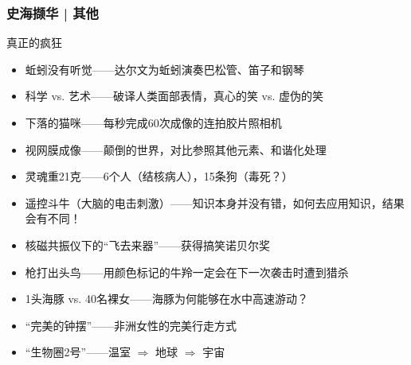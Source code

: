 \begin{frame}
  \frametitle{史海撷华 | 其他}
  \begin{block}{真正的疯狂}
    \begin{itemize}
      \item 蚯蚓没有听觉——达尔文为蚯蚓演奏巴松管、笛子和钢琴
      \item 科学 vs. 艺术——破译人类面部表情，真心的笑 vs. 虚伪的笑
      \item 下落的猫咪——每秒完成60次成像的连拍胶片照相机
      \item 视网膜成像——颠倒的世界，对比参照其他元素、和谐化处理
      \item 灵魂重21克——6个人（结核病人），15条狗（毒死？）
      \item 遥控斗牛（大脑的电击刺激）——知识本身并没有错，如何去应用知识，结果会有不同！
      \item 核磁共振仪下的“飞去来器”——获得搞笑诺贝尔奖
      \item \alert{枪打出头鸟}——用颜色标记的牛羚一定会在下一次袭击时遭到猎杀
      \item 1头海豚 vs. 40名裸女——海豚为何能够在水中高速游动？
      \item “完美的钟摆”——非洲女性的完美行走方式
      \item “生物圈2号”——温室 $\Longrightarrow$ 地球 $\Longrightarrow$ 宇宙
    \end{itemize}
  \end{block}
\end{frame}



